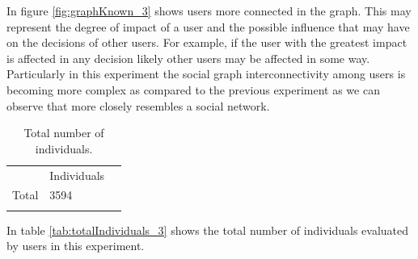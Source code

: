 In figure \ref{fig:graphKnown_3} shows users more connected in the graph. This
may represent the degree of impact of a user and the possible influence that may
have on the decisions of other users. For example, if the user with the greatest
impact is affected in any decision likely other users may be affected in some
way. Particularly in this experiment the social graph interconnectivity among
users is becoming more complex as compared to the previous experiment as we can
observe that more closely resembles a social network.


\begin{table}
\small
\caption{Total number of individuals.}
\label{tab:totalIndividuals_33} 
\centering
\small
\begin{tabular}{p{3cm} p{3cm} p{3cm} }
\hline\noalign{\smallskip}
  & Individuals &  \\
\noalign{\smallskip}\hline\noalign{\smallskip}
\small{Total } & \small{3594} & \\ \hline    
\noalign{\smallskip}\hline
\end{tabular}
\end{table}

In table \ref{tab:totalIndividuals_3} shows the total number of individuals
evaluated by users in this experiment.

